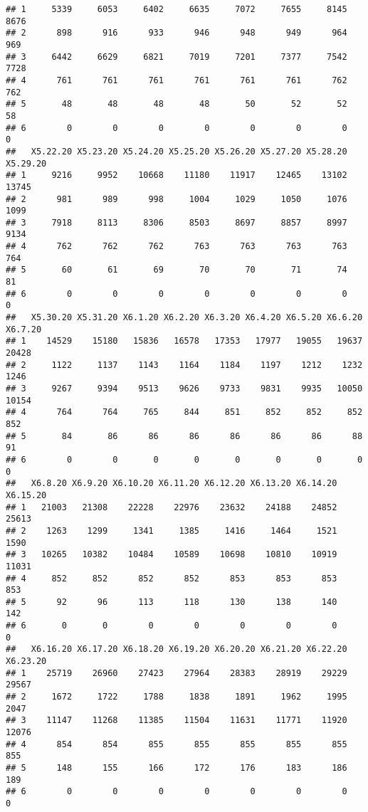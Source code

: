 \documentclass[
]{article}
\begin{document}
\begin{verbatim}
## 1     5339     6053     6402     6635     7072     7655     8145     8676
## 2      898      916      933      946      948      949      964      969
## 3     6442     6629     6821     7019     7201     7377     7542     7728
## 4      761      761      761      761      761      761      762      762
## 5       48       48       48       48       50       52       52       58
## 6        0        0        0        0        0        0        0        0
##   X5.22.20 X5.23.20 X5.24.20 X5.25.20 X5.26.20 X5.27.20 X5.28.20 X5.29.20
## 1     9216     9952    10668    11180    11917    12465    13102    13745
## 2      981      989      998     1004     1029     1050     1076     1099
## 3     7918     8113     8306     8503     8697     8857     8997     9134
## 4      762      762      762      763      763      763      763      764
## 5       60       61       69       70       70       71       74       81
## 6        0        0        0        0        0        0        0        0
##   X5.30.20 X5.31.20 X6.1.20 X6.2.20 X6.3.20 X6.4.20 X6.5.20 X6.6.20 X6.7.20
## 1    14529    15180   15836   16578   17353   17977   19055   19637   20428
## 2     1122     1137    1143    1164    1184    1197    1212    1232    1246
## 3     9267     9394    9513    9626    9733    9831    9935   10050   10154
## 4      764      764     765     844     851     852     852     852     852
## 5       84       86      86      86      86      86      86      88      91
## 6        0        0       0       0       0       0       0       0       0
##   X6.8.20 X6.9.20 X6.10.20 X6.11.20 X6.12.20 X6.13.20 X6.14.20 X6.15.20
## 1   21003   21308    22228    22976    23632    24188    24852    25613
## 2    1263    1299     1341     1385     1416     1464     1521     1590
## 3   10265   10382    10484    10589    10698    10810    10919    11031
## 4     852     852      852      852      853      853      853      853
## 5      92      96      113      118      130      138      140      142
## 6       0       0        0        0        0        0        0        0
##   X6.16.20 X6.17.20 X6.18.20 X6.19.20 X6.20.20 X6.21.20 X6.22.20 X6.23.20
## 1    25719    26960    27423    27964    28383    28919    29229    29567
## 2     1672     1722     1788     1838     1891     1962     1995     2047
## 3    11147    11268    11385    11504    11631    11771    11920    12076
## 4      854      854      855      855      855      855      855      855
## 5      148      155      166      172      176      183      186      189
## 6        0        0        0        0        0        0        0        0

\end{verbatim}
\end{document}
